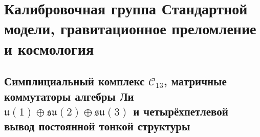 \chapter{Калибровочная группа Стандартной модели, гравитационное преломление и космология}
\label{ch:mono-sm-gravity}

\section{Симплициальный комплекс \texorpdfstring{$\mathcal{C}_{13}$}{C13}, матричные коммутаторы алгебры Ли \texorpdfstring{$\mathfrak{u}(1)\oplus\mathfrak{su}(2)\oplus\mathfrak{su}(3)$}{u(1) + su(2) + su(3)} и четырёхпетлевой вывод постоянной тонкой структуры}

